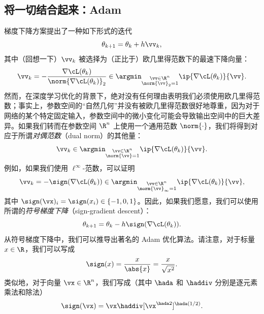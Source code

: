 \documentclass[../../book-main_zh.tex]{subfiles}
\begin{document}
\subsection{将一切结合起来：Adam}

梯度下降方案提出了一种如下形式的迭代
\begin{equation}
    \theta_{k + 1} = \theta_{k} + h\vv_{k},
\end{equation}
其中（回想一下）\(\vv_{k}\) 被选择为（正比于）欧几里得范数下的最速下降向量：
\begin{equation}
    \vv_{k} = -\frac{\nabla \cL(\theta_{k})}{\norm{\nabla
    \cL(\theta_{k})}_{2}} \in \argmin_{\substack{\vv \in \R^{n}
    \\ \norm{\vv}_{2} = 1}}\ip{\nabla \cL(\theta_{k})}{\vv}.
\end{equation}
然而，在深度学习优化的背景下，绝对没有任何理由表明我们必须使用欧几里得范数；事实上，参数空间的“自然几何”并没有被欧几里得范数很好地尊重，因为对于网络的某个特定固定输入，参数空间中的微小变化可能会导致输出空间中的巨大差异。如果我们转而在参数空间 \(\R^{n}\) 上使用一个通用范数 \(\norm{\cdot}\)，我们将得到对应于所谓\textit{对偶范数}（dual norm）的其他量：
\begin{equation}
    \vv_{k} \in \argmin_{\substack{\vv \in \R^{n} \\ \norm{\vv} =
    1}}\ip{\nabla \cL(\theta_{k})}{\vv}.
\end{equation}
例如，如果我们使用 \(\ell^{\infty}\)-范数，可以证明
\begin{equation}
    \vv_{k} = -\sign(\nabla \cL(\theta_{k})) \in
    \argmin_{\substack{\vv \in \R^{n} \\ \norm{\vv}_{\infty} =
    1}}\ip{\nabla \cL(\theta_{k})}{\vv},
\end{equation}
其中 \(\sign(\vx)_{i} = \sign(x_{i}) \in \{-1, 0, 1\}\)。因此，如果我们愿意，我们可以使用所谓的\textit{符号梯度下降}（sign-gradient descent）：
\begin{equation}\label{eq:sign_gradient_descent}
    \theta_{k + 1} = \theta_{k} - h\sign(\nabla \cL(\theta_{k})).
\end{equation}
从符号梯度下降中，我们可以推导出著名的 Adam 优化算法。请注意，对于标量 \(x \in \R\)，我们可以写成
\begin{equation}
    \sign(x) = \frac{x}{\abs{x}} = \frac{x}{\sqrt{x^{2}}}.
\end{equation}
类似地，对于向量 \(\vx \in \R^{n}\)，我们写成（其中 \(\hada\) 和
\(\haddiv\) 分别是逐元素乘法和除法）
\begin{equation}
    \sign(\vx) = \vx \haddiv [\vx^{\hada 2}]^{\hada (1/2)}.
\end{equation}
\end{document}
